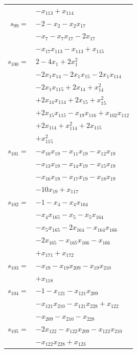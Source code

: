 \begin{longtable}{@{}r@{\;}l@{}}
 & \(\displaystyle -x_{113} +x_{114}\) \\[3pt]
\(s_{99}=\) & \(\displaystyle -2 -x_{2} -x_{2}x_{17}\) \\
 & \(\displaystyle -x_{7} -x_{7}x_{17} -2x_{17}\) \\
 & \(\displaystyle -x_{17}x_{113} -x_{113} +x_{115}\) \\[3pt]
\(s_{100}=\) & \(\displaystyle 2 -4x_{1} +2x_{1}^{2}\) \\
 & \(\displaystyle -2x_{1}x_{14} -2x_{1}x_{15} -2x_{1}x_{114}\) \\
 & \(\displaystyle -2x_{1}x_{115} +2x_{14} +x_{14}^{2}\) \\
 & \(\displaystyle +2x_{14}x_{114} +2x_{15} +x_{15}^{2}\) \\
 & \(\displaystyle +2x_{15}x_{115} -x_{19}x_{116} +x_{102}x_{112}\) \\
 & \(\displaystyle +2x_{114} +x_{114}^{2} +2x_{115}\) \\
 & \(\displaystyle +x_{115}^{2}\) \\[3pt]
\(s_{101}=\) & \(\displaystyle -x_{10}x_{19} -x_{11}x_{19} -x_{12}x_{19}\) \\
 & \(\displaystyle -x_{13}x_{19} -x_{14}x_{19} -x_{15}x_{19}\) \\
 & \(\displaystyle -x_{16}x_{19} -x_{17}x_{19} -x_{18}x_{19}\) \\
 & \(\displaystyle -10x_{19} +x_{117}\) \\[3pt]
\(s_{102}=\) & \(\displaystyle -1 -x_{4} -x_{4}x_{164}\) \\
 & \(\displaystyle -x_{4}x_{165} -x_{5} -x_{5}x_{164}\) \\
 & \(\displaystyle -x_{5}x_{165} -2x_{164} -x_{164}x_{166}\) \\
 & \(\displaystyle -2x_{165} -x_{165}x_{166} -x_{166}\) \\
 & \(\displaystyle +x_{171} +x_{172}\) \\[3pt]
\(s_{103}=\) & \(\displaystyle -x_{19} -x_{19}x_{209} -x_{19}x_{210}\) \\
 & \(\displaystyle +x_{118}\) \\[3pt]
\(s_{104}=\) & \(\displaystyle -1 -x_{121} -x_{121}x_{209}\) \\
 & \(\displaystyle -x_{121}x_{210} -x_{121}x_{228} +x_{122}\) \\
 & \(\displaystyle -x_{209} -x_{210} -x_{228}\) \\[3pt]
\(s_{105}=\) & \(\displaystyle -2x_{122} -x_{122}x_{209} -x_{122}x_{210}\) \\
 & \(\displaystyle -x_{122}x_{228} +x_{123}\) \\[3pt]

\end{longtable}
